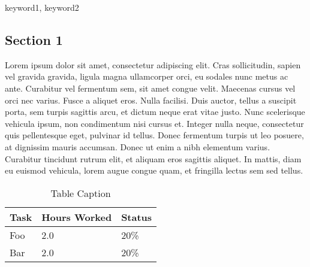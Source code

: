 \documentclass[12pt,article]{IEEEtran}
\newcommand{\KEYWORDS}{keyword1, keyword2}
\newcommand{\ABSTRACT}{we think....}
\begin{document}


\begin{keywords}
\KEYWORDS
\end{keywords}

\begin{abstract}
\ABSTRACT
\end{abstract}
	 

\subsection{Section 1}

Lorem ipsum dolor sit amet, consectetur adipiscing elit. Cras sollicitudin, sapien vel gravida gravida, ligula magna ullamcorper orci, eu sodales nunc metus ac ante. Curabitur vel fermentum sem, sit amet congue velit. Maecenas cursus vel orci nec varius. Fusce a aliquet eros. Nulla facilisi. Duis auctor, tellus a suscipit porta, sem turpis sagittis arcu, et dictum neque erat vitae justo. Nunc scelerisque vehicula ipsum, non condimentum nisi cursus et. Integer nulla neque, consectetur quis pellentesque eget, pulvinar id tellus. Donec fermentum turpis ut leo posuere, at dignissim mauris accumsan. Donec ut enim a nibh elementum varius. Curabitur tincidunt rutrum elit, et aliquam eros sagittis aliquet. In mattis, diam eu euismod vehicula, lorem augue congue quam, et fringilla lectus sem sed tellus.

\begin{table}[ht]
\renewcommand{\arraystretch}{1.3}
	\caption{Table Caption}
	
	\label{Navigation Menu Label}
	
	\centering
	\begin{tabular}{p{5.5cm}|p{1cm}|p{1cm}}
	\hline
	\bfseries 	Task		 		& \bfseries Hours Worked	& \bfseries Status	\\
	\hline\hline
				Foo					& 2.0						& 20\%				\\	%
				Bar			 		& 2.0						& 20\%				\\		
	\hline
	\end{tabular}
\end{table}
\end{document}

